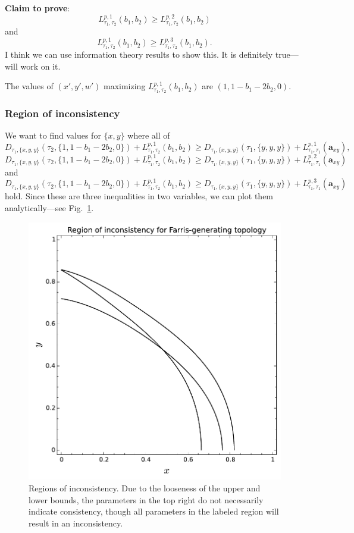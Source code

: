\documentclass[a4paper]{article}
\newcommand{\shannonDivergence}{D}
\begin{document}
\textbf{Claim to prove}:
$$
L^{p,1}_{\tau_1,\tau_2}(b_1, b_2) \ge L^{p,2}_{\tau_1,\tau_2}(b_1, b_2)
$$
and
$$
L^{p,1}_{\tau_1,\tau_2}(b_1, b_2) \ge L^{p,3}_{\tau_1,\tau_2}(b_1, b_2).
$$
I think we can use information theory results to show this.
It is definitely true---will work on it.

The values of $(x', y', w')$ maximizing $L^{p,1}_{\tau_1,\tau_2}(b_1, b_2)$ are $(1, 1-b_1-2b_2,0)$.

\subsubsection{Region of inconsistency}

We want to find values for $\{x,y\}$ where all of
$$
\shannonDivergence_{\tau_1,\{x,y,y\}}(\tau_2,\{1, 1-b_{1}-2b_{2}, 0\}) + L^{p,1}_{\tau_1,\tau_2}(b_{1},b_{2}) \ge \shannonDivergence_{\tau_1,\{x,y,y\}}(\tau_1,\{y, y, y\}) + L^{p,1}_{\tau_1,\tau_1}(\mathbf{a}_{xy}),
$$
$$
\shannonDivergence_{\tau_1,\{x,y,y\}}(\tau_2,\{1, 1-b_{1}-2b_{2}, 0\}) + L^{p,1}_{\tau_1,\tau_2}(b_{1},b_{2}) \ge \shannonDivergence_{\tau_1,\{x,y,y\}}(\tau_1,\{y, y, y\}) + L^{p,2}_{\tau_1,\tau_1}(\mathbf{a}_{xy})
$$
and
$$
\shannonDivergence_{\tau_1,\{x,y,y\}}(\tau_2,\{1, 1-b_{1}-2b_{2}, 0\}) + L^{p,1}_{\tau_1,\tau_2}(b_{1},b_{2}) \ge \shannonDivergence_{\tau_1,\{x,y,y\}}(\tau_1,\{y, y, y\}) + L^{p,3}_{\tau_1,\tau_1}(\mathbf{a}_{xy})
$$
hold.
Since these are three inequalities in two variables, we can plot them analytically---see Fig.~\ref{fig:inconsistency-farris}.

\begin{figure}
\centering
\includegraphics[width=.9\textwidth]{analytic-inconsistency}
\caption{
    Regions of inconsistency.
    Due to the looseness of the upper and lower bounds, the parameters in the top right do not necessarily indicate consistency, though all parameters in the labeled region will result in an inconsistency.
}
\label{fig:inconsistency-farris}
\end{figure}
\end{document}
